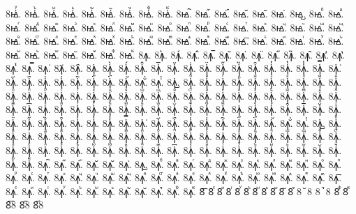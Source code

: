 {8ꙝ҆ꙷ.
8ꙝ҆ꙸ.
8ꙝ҆ꙹ.
8ꙝ҆ꙺ.
8ꙝ҆ꙻ.
8ꙝ҆꙼.
8ꙝ҆꙽.
8ꙝ҆ꚞ.
8ꙝ҆ꚟ.
8ꙝ҇.
8ꙝ᷀.
8ꙝ᷁.
8ꙝ᷶.
8ꙝ᷷.
8ꙝ᷸.
8ꙝ᷹.
8ꙝⷠ.
8ꙝⷡ.
8ꙝⷢ.
8ꙝⷣ.
8ꙝⷤ.
8ꙝⷥ.
8ꙝⷦ.
8ꙝⷧ.
8ꙝⷨ.
8ꙝⷩ.
8ꙝⷪ.
8ꙝⷫ.
8ꙝⷬ.
8ꙝⷭ.
8ꙝⷮ.
8ꙝⷯ.
8ꙝⷰ.
8ꙝⷱ.
8ꙝⷲ.
8ꙝⷳ.
8ꙝⷴ.
8ꙝⷵ.
8ꙝⷶ.
8ꙝⷷ.
8ꙝⷸ.
8ꙝⷹ.
8ꙝⷺ.
8ꙝⷻ.
8ꙝⷼ.
8ꙝⷽ.
8ꙝⷾ.
8ꙝⷿ.
8ꙝ꙯.
8ꙝꙴ.
8ꙝꙵ.
8ꙝꙶ.
8ꙝꙷ.
8ꙝꙸ.
8ꙝꙹ.
8ꙝꙺ.
8ꙝꙻ.
8ꙝ꙼.
8ꙝ꙽.
8ꙝꚞ.
8ꙝꚟ.
8ꙟ.
8ꙟ̀.
8ꙟ́.
8ꙟ̂.
8ꙟ̅.
8ꙟ̆.
8ꙟ̇.
8ꙟ̈.
8ꙟ̋.
8ꙟ̏.
8ꙟ̑.
8ꙟ̓.
8ꙟ̔.
8ꙟ̾.
8ꙟ̿.
8ꙟ͘.
8ꙟ҃.
8ꙟ҄.
8ꙟ҅.
8ꙟ҅̀.
8ꙟ҅́.
8ꙟ҅̂.
8ꙟ҅̅.
8ꙟ҅̆.
8ꙟ҅̇.
8ꙟ҅̈.
8ꙟ҅̋.
8ꙟ҅̏.
8ꙟ҅̑.
8ꙟ҅̓.
8ꙟ҅̔.
8ꙟ҅̾.
8ꙟ҅̿.
8ꙟ҅͘.
8ꙟ҅҃.
8ꙟ҅҄.
8ꙟ҅҅.
8ꙟ҅҆.
8ꙟ҅҇.
8ꙟ҅᷀.
8ꙟ҅᷁.
8ꙟ҅᷶.
8ꙟ᷷҅.
8ꙟ᷸҅.
8ꙟ᷹҅.
8ꙟ҅ⷠ.
8ꙟ҅ⷡ.
8ꙟ҅ⷢ.
8ꙟ҅ⷣ.
8ꙟ҅ⷤ.
8ꙟ҅ⷥ.
8ꙟ҅ⷦ.
8ꙟ҅ⷧ.
8ꙟ҅ⷨ.
8ꙟ҅ⷩ.
8ꙟ҅ⷪ.
8ꙟ҅ⷫ.
8ꙟ҅ⷬ.
8ꙟ҅ⷭ.
8ꙟ҅ⷮ.
8ꙟ҅ⷯ.
8ꙟ҅ⷰ.
8ꙟ҅ⷱ.
8ꙟ҅ⷲ.
8ꙟ҅ⷳ.
8ꙟ҅ⷴ.
8ꙟ҅ⷵ.
8ꙟ҅ⷶ.
8ꙟ҅ⷷ.
8ꙟ҅ⷸ.
8ꙟ҅ⷹ.
8ꙟ҅ⷺ.
8ꙟ҅ⷻ.
8ꙟ҅ⷼ.
8ꙟ҅ⷽ.
8ꙟ҅ⷾ.
8ꙟ҅ⷿ.
8ꙟ҅꙯.
8ꙟ҅ꙴ.
8ꙟ҅ꙵ.
8ꙟ҅ꙶ.
8ꙟ҅ꙷ.
8ꙟ҅ꙸ.
8ꙟ҅ꙹ.
8ꙟ҅ꙺ.
8ꙟ҅ꙻ.
8ꙟ҅꙼.
8ꙟ҅꙽.
8ꙟ҅ꚞ.
8ꙟ҅ꚟ.
8ꙟ҆.
8ꙟ҆̀.
8ꙟ҆́.
8ꙟ҆̂.
8ꙟ҆̅.
8ꙟ҆̆.
8ꙟ҆̇.
8ꙟ҆̈.
8ꙟ҆̋.
8ꙟ҆̏.
8ꙟ҆̑.
8ꙟ҆̓.
8ꙟ҆̔.
8ꙟ҆̾.
8ꙟ҆̿.
8ꙟ҆͘.
8ꙟ҆҃.
8ꙟ҆҄.
8ꙟ҆҅.
8ꙟ҆҆.
8ꙟ҆҇.
8ꙟ҆᷀.
8ꙟ҆᷁.
8ꙟ҆᷶.
8ꙟ᷷҆.
8ꙟ᷸҆.
8ꙟ᷹҆.
8ꙟ҆ⷠ.
8ꙟ҆ⷡ.
8ꙟ҆ⷢ.
8ꙟ҆ⷣ.
8ꙟ҆ⷤ.
8ꙟ҆ⷥ.
8ꙟ҆ⷦ.
8ꙟ҆ⷧ.
8ꙟ҆ⷨ.
8ꙟ҆ⷩ.
8ꙟ҆ⷪ.
8ꙟ҆ⷫ.
8ꙟ҆ⷬ.
8ꙟ҆ⷭ.
8ꙟ҆ⷮ.
8ꙟ҆ⷯ.
8ꙟ҆ⷰ.
8ꙟ҆ⷱ.
8ꙟ҆ⷲ.
8ꙟ҆ⷳ.
8ꙟ҆ⷴ.
8ꙟ҆ⷵ.
8ꙟ҆ⷶ.
8ꙟ҆ⷷ.
8ꙟ҆ⷸ.
8ꙟ҆ⷹ.
8ꙟ҆ⷺ.
8ꙟ҆ⷻ.
8ꙟ҆ⷼ.
8ꙟ҆ⷽ.
8ꙟ҆ⷾ.
8ꙟ҆ⷿ.
8ꙟ҆꙯.
8ꙟ҆ꙴ.
8ꙟ҆ꙵ.
8ꙟ҆ꙶ.
8ꙟ҆ꙷ.
8ꙟ҆ꙸ.
8ꙟ҆ꙹ.
8ꙟ҆ꙺ.
8ꙟ҆ꙻ.
8ꙟ҆꙼.
8ꙟ҆꙽.
8ꙟ҆ꚞ.
8ꙟ҆ꚟ.
8ꙟ҇.
8ꙟ᷀.
8ꙟ᷁.
8ꙟ᷶.
8ꙟ᷷.
8ꙟ᷸.
8ꙟ᷹.
8ꙟⷠ.
8ꙟⷡ.
8ꙟⷢ.
8ꙟⷣ.
8ꙟⷤ.
8ꙟⷥ.
8ꙟⷦ.
8ꙟⷧ.
8ꙟⷨ.
8ꙟⷩ.
8ꙟⷪ.
8ꙟⷫ.
8ꙟⷬ.
8ꙟⷭ.
8ꙟⷮ.
8ꙟⷯ.
8ꙟⷰ.
8ꙟⷱ.
8ꙟⷲ.
8ꙟⷳ.
8ꙟⷴ.
8ꙟⷵ.
8ꙟⷶ.
8ꙟⷷ.
8ꙟⷸ.
8ꙟⷹ.
8ꙟⷺ.
8ꙟⷻ.
8ꙟⷼ.
8ꙟⷽ.
8ꙟⷾ.
8ꙟⷿ.
8ꙟ꙯.
8ꙟꙴ.
8ꙟꙵ.
8ꙟꙶ.
8ꙟꙷ.
8ꙟꙸ.
8ꙟꙹ.
8ꙟꙺ.
8ꙟꙻ.
8ꙟ꙼.
8ꙟ꙽.
8ꙟꚞ.
8ꙟꚟ.
8꙯
8ꙴ
8ꙵ
8ꙶ
8ꙷ
8ꙸ
8ꙹ
8ꙺ
8ꙻ
8꙼
8꙽
8꙾8
8ꙿ8
8ꚞ
8ꚟ
8︦8
8︮8
8︯8
}
